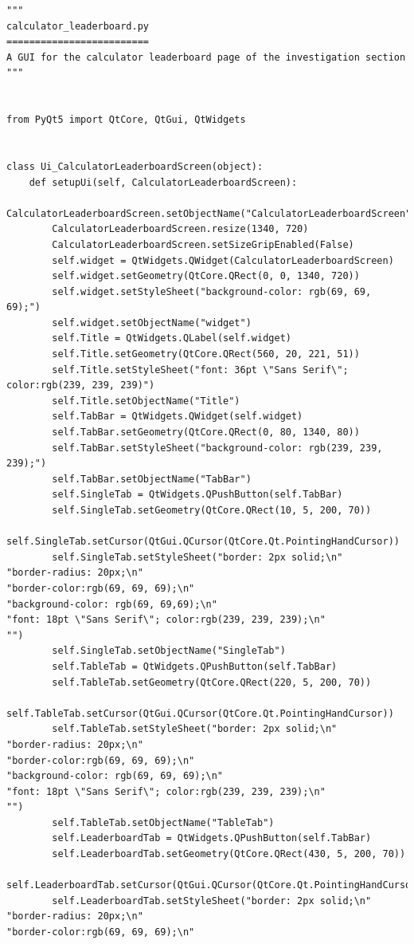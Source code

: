 \documentclass[12pt]{article}
\begin{document}
\begin{lstlisting}
"""
calculator_leaderboard.py
=========================
A GUI for the calculator leaderboard page of the investigation section
"""


from PyQt5 import QtCore, QtGui, QtWidgets


class Ui_CalculatorLeaderboardScreen(object):
    def setupUi(self, CalculatorLeaderboardScreen):
        CalculatorLeaderboardScreen.setObjectName("CalculatorLeaderboardScreen")
        CalculatorLeaderboardScreen.resize(1340, 720)
        CalculatorLeaderboardScreen.setSizeGripEnabled(False)
        self.widget = QtWidgets.QWidget(CalculatorLeaderboardScreen)
        self.widget.setGeometry(QtCore.QRect(0, 0, 1340, 720))
        self.widget.setStyleSheet("background-color: rgb(69, 69, 69);")
        self.widget.setObjectName("widget")
        self.Title = QtWidgets.QLabel(self.widget)
        self.Title.setGeometry(QtCore.QRect(560, 20, 221, 51))
        self.Title.setStyleSheet("font: 36pt \"Sans Serif\"; color:rgb(239, 239, 239)")
        self.Title.setObjectName("Title")
        self.TabBar = QtWidgets.QWidget(self.widget)
        self.TabBar.setGeometry(QtCore.QRect(0, 80, 1340, 80))
        self.TabBar.setStyleSheet("background-color: rgb(239, 239, 239);")
        self.TabBar.setObjectName("TabBar")
        self.SingleTab = QtWidgets.QPushButton(self.TabBar)
        self.SingleTab.setGeometry(QtCore.QRect(10, 5, 200, 70))
        self.SingleTab.setCursor(QtGui.QCursor(QtCore.Qt.PointingHandCursor))
        self.SingleTab.setStyleSheet("border: 2px solid;\n"
"border-radius: 20px;\n"
"border-color:rgb(69, 69, 69);\n"
"background-color: rgb(69, 69,69);\n"
"font: 18pt \"Sans Serif\"; color:rgb(239, 239, 239);\n"
"")
        self.SingleTab.setObjectName("SingleTab")
        self.TableTab = QtWidgets.QPushButton(self.TabBar)
        self.TableTab.setGeometry(QtCore.QRect(220, 5, 200, 70))
        self.TableTab.setCursor(QtGui.QCursor(QtCore.Qt.PointingHandCursor))
        self.TableTab.setStyleSheet("border: 2px solid;\n"
"border-radius: 20px;\n"
"border-color:rgb(69, 69, 69);\n"
"background-color: rgb(69, 69, 69);\n"
"font: 18pt \"Sans Serif\"; color:rgb(239, 239, 239);\n"
"")
        self.TableTab.setObjectName("TableTab")
        self.LeaderboardTab = QtWidgets.QPushButton(self.TabBar)
        self.LeaderboardTab.setGeometry(QtCore.QRect(430, 5, 200, 70))
        self.LeaderboardTab.setCursor(QtGui.QCursor(QtCore.Qt.PointingHandCursor))
        self.LeaderboardTab.setStyleSheet("border: 2px solid;\n"
"border-radius: 20px;\n"
"border-color:rgb(69, 69, 69);\n"

\end{lstlisting}
\end{document}
